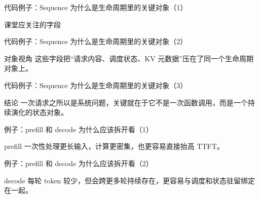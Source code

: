 \begin{frame}{代码例子：Sequence 为什么是生命周期里的关键对象（1）}
\begin{block}{课堂应关注的字段}
    {\ttfamily\small
    \par
    \par
    \par
    \par
    }
  \end{block}
\end{frame}

\begin{frame}{代码例子：Sequence 为什么是生命周期里的关键对象（2）}
\begin{block}{对象视角}
    这些字段把“请求内容、调度状态、KV 元数据”压在了同一个生命周期对象上。
  \end{block}
\end{frame}

\begin{frame}{代码例子：Sequence 为什么是生命周期里的关键对象（3）}
\begin{block}{结论}
    一次请求之所以是系统问题，关键就在于它不是一次函数调用，而是一个持续演化的状态对象。
  \end{block}
\end{frame}

\begin{frame}{例子：prefill 和 decode 为什么应该拆开看（1）}
\begin{block}{prefill}
    一次性处理更长输入，计算更密集，也更容易直接抬高 TTFT。
  \end{block}
\end{frame}

\begin{frame}{例子：prefill 和 decode 为什么应该拆开看（2）}
\begin{block}{decode}
    每轮 token 较少，但会跨更多轮持续存在，更容易与调度和状态驻留绑定在一起。
  \end{block}
\end{frame}

